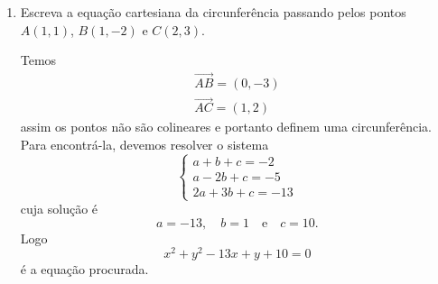 \begin{exemplos}
    \begin{enumerate}
        \item Escreva a equação cartesiana da circunferência passando pelos pontos $A(1,1)$, $B(1,-2)$ e $C(2,3)$.
              \begin{solucao}
                  Temos
                  \begin{align*}
                      \vec{AB} = (0,-3) \\
                      \vec{AC} = (1,2)
                  \end{align*}
                  assim os pontos não são colineares e portanto definem uma circunferência. Para encontrá-la, devemos resolver o sistema
                  \[
                      \begin{cases}
                          a + b + c = -2  \\
                          a - 2b + c = -5 \\
                          2a + 3b + c = -13
                      \end{cases}
                  \]
                  cuja solução é
                  \[
                      a = -13,\quad b = 1 \quad\mbox{e}\quad c = 10.
                  \]
                  Logo
                  \[
                      x^2 + y^2 - 13x + y + 10 = 0
                  \]
                  é a equação procurada.


\end{solucao}
\end{enumerate}
\end{exemplos}
